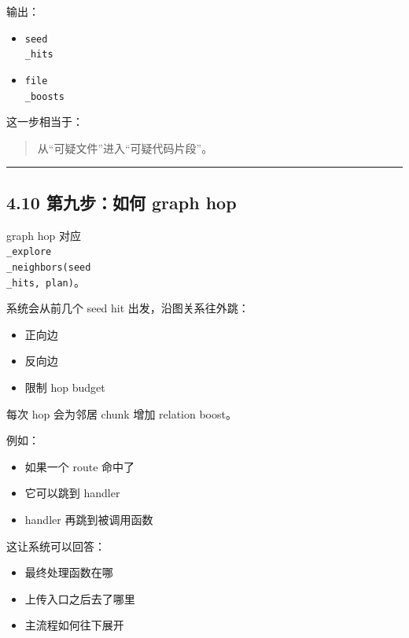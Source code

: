\documentclass[UTF8,12pt,openany]{ctexbook}
\begin{document}
输出：\par

\begin{itemize}
\item \texttt{seed\\_hits}
\item \texttt{file\\_boosts}
\end{itemize}

这一步相当于：\par

\begin{quote}
从“可疑文件”进入“可疑代码片段”。
\end{quote}

\hrule

\subsection{4.10 第九步：如何 graph hop}

graph hop 对应 \texttt{\\_explore\\_neighbors(seed\\_hits, plan)}。\par

系统会从前几个 seed hit 出发，沿图关系往外跳：\par

\begin{itemize}
\item 正向边
\item 反向边
\item 限制 hop budget
\end{itemize}

每次 hop 会为邻居 chunk 增加 relation boost。\par

例如：\par

\begin{itemize}
\item 如果一个 route 命中了
\item 它可以跳到 handler
\item handler 再跳到被调用函数
\end{itemize}

这让系统可以回答：\par

\begin{itemize}
\item 最终处理函数在哪
\item 上传入口之后去了哪里
\item 主流程如何往下展开
\end{itemize}
\end{document}
